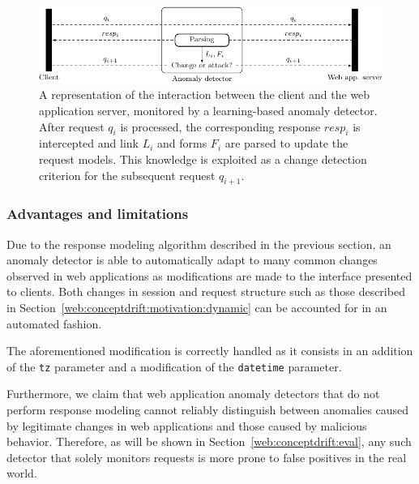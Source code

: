 \begin{figure}[t]
  \centering
  \includegraphics[width=\textwidth]{figures/web/conceptdrift/fig_design}

  \caption{A representation of the interaction between the client and the web application server, monitored by a learning-based anomaly detector. After request $q_{i}$ is processed, the corresponding response $resp_{i}$ is intercepted and link $L_{i}$ and forms $F_{i}$ are parsed to update the request models. This knowledge is exploited as a change detection criterion for the subsequent request $q_{i+1}$.}
  \label{fig:design}
  \vspace*{-.5cm}
\end{figure}

\subsubsection{Advantages and limitations}
\label{web:conceptdrift:design:discussion}
Due to the response modeling algorithm described in the previous section, an anomaly detector is able to automatically adapt to many common changes observed in web applications as modifications are made to the interface presented to clients.  Both changes in session and request structure such as those described in Section~\ref{web:conceptdrift:motivation:dynamic} can be accounted for in an automated fashion.

\begin{example}[I18N and L10N]
  The aforementioned modification is correctly handled as it consists in an addition of the \texttt{tz} parameter and a modification of the \texttt{datetime} parameter.
\end{example}

Furthermore, we claim that web application anomaly detectors that do not perform response modeling cannot reliably distinguish between anomalies caused by legitimate changes in web applications and those caused by malicious behavior.  Therefore, as will be shown in Section~\ref{web:conceptdrift:eval}, any such detector that solely monitors requests is more prone to false positives in the real world.

\medskip

